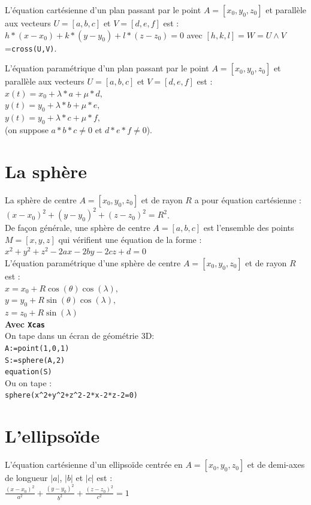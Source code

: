 \documentclass[a4paper,11pt]{book}
\begin{document}
L'\'equation cart\'esienne d'un plan passant par le point $A=[x_0,y_0,z_0]$ et
parall\`ele aux vecteurs $U=[a,b,c]$ et $V=[d,e,f]$ est :\\
$h*(x-x_0)+k*(y-y_0)+l*(z-z_0)=0$ avec $[h,k,l]=W=U\wedge V$={\tt cross(U,V)}.

L'\'equation param\'etrique d'un plan passant par le point $A=[x_0,y_0,z_0]$ et
parall\`ele aux vecteurs $U=[a,b,c]$ et $V=[d,e,f]$ est :\\
$x(t)=x_0+\lambda*a+\mu*d,$\\
$y(t)=y_0+\lambda*b+\mu*e,$\\
$y(t)=y_0+\lambda*c+\mu*f,$\\ (on suppose $a*b*c \neq 0$ et $d*e*f \neq 0$).\\

\section{La sph\`ere}
La sph\`ere de centre $A=[x_0,y_0,z_0]$ et de rayon $R$ a pour \'equation 
cart\'esienne :\\
$(x-x_0)^2+(y-y_0)^2+(z-z_0)^2=R^2$.\\
De fa\c{c}on g\'en\'erale, une sph\`ere de centre $A=[a,b,c]$
est l'ensemble des points $M=[x,y,z]$
qui v\'erifient une \'equation de la forme :\\
$x^2+y^2+z^2-2ax-2by-2cz+d=0$\\
L'\'equation param\'etrique d'une sph\`ere de centre $A=[x_0,y_0,z_0]$ et de 
rayon $R$ est :\\
$x=x_0+R\cos(\theta)\cos(\lambda),$\\
$ y=y_0+R\sin(\theta)\cos(\lambda),$\\
$z=z_0+R\sin(\lambda)$\\
{\bf Avec {\tt Xcas}}\\
On tape dans un \'ecran de g\'eom\'etrie 3D:\\
{\tt A:=point(1,0,1)}\\
{\tt S:=sphere(A,2)}\\
{\tt equation(S)}\\
Ou on tape :\\
{\tt sphere(x\verb|^|2+y\verb|^|2+z\verb|^|2-2*x-2*z-2=0)}\\
\section{L'ellipso\"{i}de}
\noindent L'\'equation cart\'esienne d'un ellipso\"{i}de centr\'ee en 
$A=[x_0,y_0,z_0]$ 
et de demi-axes de longueur  $|a|$, $|b|$ et $|c|$ est :\\
$\displaystyle \frac{(x-x_0)^2}{a^2}+\frac{(y-y_0)^2}{b^2}+\frac{(z-z_0)^2}{c^2}=1$ \\
\end{document}
